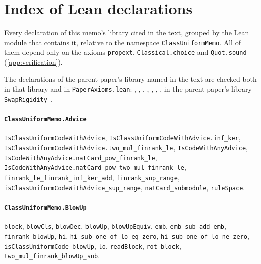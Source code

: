 \section{Index of Lean declarations}\label{app:leanindex}

Every declaration of this memo's library cited in the text, grouped by the Lean module that contains it, relative to the namespace
\texttt{ClassUniformMemo}. All of them depend only on the axioms \texttt{propext}, \texttt{Classical.choice} and
\texttt{Quot.sound} (\cref{app:verification}).
{\raggedright The declarations of the parent paper's library named in the text are checked both in that library and in \texttt{PaperAxioms.lean}: , , , , , , ,  in the parent paper's library \texttt{SwapRigidity}~\cite{SeventeenthPaper2026}.\par}

\paragraph{\texttt{ClassUniformMemo.Advice}}
{\small\raggedright \texttt{IsClassUniformCodeWithAdvice}, \texttt{IsClassUniformCodeWithAdvice.inf\_ker}, \texttt{IsClassUniformCodeWithAdvice.two\_mul\_finrank\_le}, \texttt{IsCodeWithAnyAdvice}, \texttt{IsCodeWithAnyAdvice.natCard\_pow\_finrank\_le}, \texttt{IsCodeWithAnyAdvice.natCard\_pow\_two\_mul\_finrank\_le}, \texttt{finrank\_le\_finrank\_inf\_ker\_add}, \texttt{finrank\_sup\_range}, \texttt{isClassUniformCodeWithAdvice\_sup\_range}, \texttt{natCard\_submodule}, \texttt{ruleSpace}.\par}

\paragraph{\texttt{ClassUniformMemo.BlowUp}}
{\small\raggedright \texttt{block}, \texttt{blowCls}, \texttt{blowDec}, \texttt{blowUp}, \texttt{blowUpEquiv}, \texttt{emb}, \texttt{emb\_sub\_add\_emb}, \texttt{finrank\_blowUp}, \texttt{hi}, \texttt{hi\_sub\_one\_of\_lo\_eq\_zero}, \texttt{hi\_sub\_one\_of\_lo\_ne\_zero}, \texttt{isClassUniformCode\_blowUp}, \texttt{lo}, \texttt{readBlock}, \texttt{rot\_block}, \texttt{two\_mul\_finrank\_blowUp\_sub}.\par}

